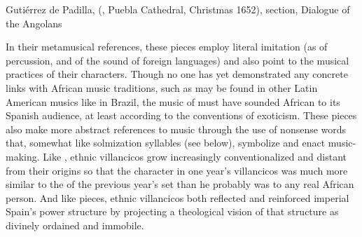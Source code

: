 
\begin{musicexample}
    \caption{Gutiérrez de Padilla,  (, Puebla Cathedral, Christmas 1652),
     section, Dialogue of the Angolans}
    \label{mus:Padilla-Al_establo-Negrilla}
\end{musicexample}

In their metamusical references, these pieces employ literal
imitation (as of percussion, and of the  sound of foreign
languages) and also point to the musical practices of their characters.
Though no one has yet demonstrated any concrete links with African music
traditions, such as may be found in other Latin American musics like
 in Brazil, the music of  must have
sounded African to its Spanish audience, at least according to the conventions
of exoticism.%
    \Autocite{Kubik:AngolanTraits} 
These pieces also make more abstract references to music through the use of
nonsense words that, somewhat like solmization syllables (see below), symbolize
and enact music-making.
Like , ethnic villancicos grow increasingly conventionalized and
distant from their origins so that the  character in one year's
villancicos was much more similar to the  of the previous year's
set than he probably was to any real African person.
And like  pieces, ethnic villancicos both reflected and reinforced
imperial Spain's power structure by projecting a theological vision of that
structure as divinely ordained and immobile.

